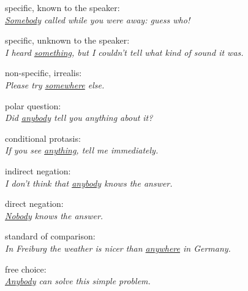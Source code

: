 \begin{figure}[h]
\pex[labeltype=numeric]\label{ex:indeftypo}
\a specific, known to the speaker: \smallskip\\ %
	\textit{\underline{Somebody} called while you were away: guess who!}
	
\a specific, unknown to the speaker: \smallskip\\ %
	\textit{I heard \underline{something}, but I couldn't tell what kind of 
	sound it was.}
	
\a non-specific, irrealis: \smallskip\\ %
	\textit{Please try \underline{somewhere} else.}
	
\a polar question: \smallskip\\ %
	\textit{Did \underline{anybody} tell you anything about it?}
	
\a conditional protasis: \smallskip\\ %
	\textit{If you see \underline{anything}, tell me immediately.}
	
\a indirect negation: \smallskip\\ %
	\textit{I don't think that \underline{anybody} knows the answer.}
	
\a direct negation: \smallskip\\ %
	\textit{\underline{Nobody} knows the answer.}
	
\a standard of comparison: \smallskip\\ %
	\textit{In Freiburg the weather is nicer than \underline{anywhere} in 
	Germany.}
	
\a free choice: \smallskip\\ %
	\textit{\underline{Anybody} can solve this simple problem.}
\xe
\end{figure}

